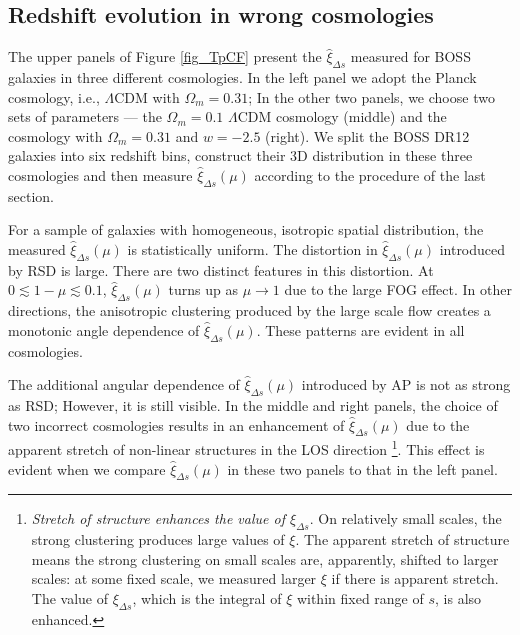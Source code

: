 \documentclass[iop]{emulateapj}
\begin{document}
\subsection{Redshift evolution in wrong cosmologies}\label{sec:redevolvxi}


The upper panels of Figure \ref{fig_TpCF} present the $\hat \xi_{\Delta s}$ measured for BOSS galaxies in three different cosmologies.
In the left panel we adopt the Planck cosmology, i.e., $\Lambda$CDM with $\Omega_m=0.31$;
In the other two panels, we choose two sets of parameters ---
the $\Omega_m=0.1$ $\Lambda$CDM cosmology (middle) and the cosmology with $\Omega_m=0.31$ and $w=-2.5$ (right).
We split the BOSS DR12 galaxies into six redshift bins,
construct their 3D distribution in these three cosmologies
and then measure $\hat \xi_{\Delta s}(\mu)$ according to the procedure of the last section.

For a sample of galaxies with homogeneous, isotropic spatial distribution, 
the measured $\hat \xi_{\Delta s}(\mu)$ is statistically uniform.
The distortion in $\hat \xi_{\Delta s}(\mu)$ introduced by RSD is large.
There are two distinct features in this distortion.
At $0\lesssim 1-\mu \lesssim 0.1$, $\hat \xi_{\Delta s}(\mu)$ turns up as $\mu\rightarrow1$
due to the large FOG effect.
In other directions, the anisotropic clustering produced by the large scale flow creates a monotonic angle dependence of $\hat\xi_{\Delta s}(\mu)$. %
These patterns are evident in all cosmologies.




The additional angular dependence of $\hat \xi_{\Delta s}(\mu)$ introduced by AP is not as strong as RSD;
However, it is still visible. 
In the middle and right panels, %
the choice of two incorrect cosmologies results in an enhancement of  $\hat \xi_{\Delta s}(\mu)$ due to the 
apparent stretch of non-linear structures in the LOS direction
\footnote{{\it Stretch of structure enhances the value of $\xi_{\Delta s}$}.
On relatively small scales, the strong clustering produces large values of $\xi$.
The apparent stretch of structure means the strong clustering on small scales are, apparently, shifted to larger scales:
at some fixed scale, we measured larger $\xi$ if there is apparent stretch.
The value of $\xi_{\Delta s}$, which is the integral of $\xi$ within fixed range of $s$, is also enhanced.}.
This effect is evident when we compare  $\hat \xi_{\Delta s}(\mu)$ in these two panels to that in the left panel.
\end{document}
